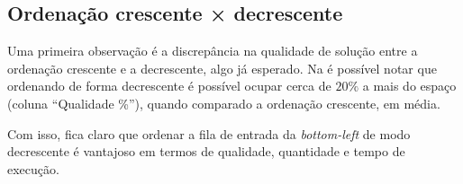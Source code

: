 \subsection{Ordenação crescente × decrescente}\label{subsec:ordenacao-crescente-decrescente}

Uma primeira observação é a discrepância na qualidade de solução entre a ordenação crescente
e a decrescente, algo já esperado.
Na  é possível notar que ordenando de forma decrescente é possível ocupar
cerca de $20\%$ a mais do espaço (coluna “Qualidade \%”), quando comparado a ordenação crescente,
em média.



Com isso, fica claro que ordenar a fila de entrada da \textit{bottom-left} de modo decrescente é
vantajoso em termos de qualidade, quantidade e tempo de execução.

